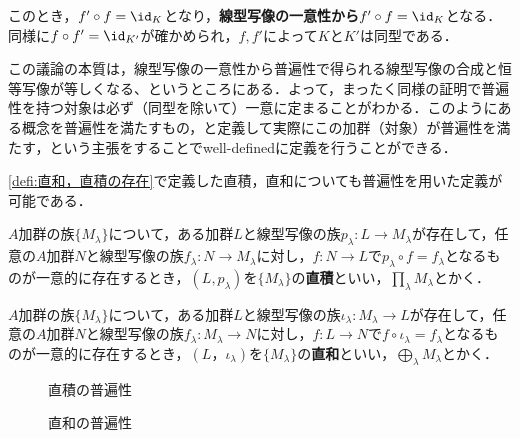 このとき，$f'\circ f=\id_K$となり，\textbf{線型写像の一意性から}$f'\circ f=\id_K$となる．同様に$f\circ f'=\id_{K'}$が確かめられ，$f,f'$によって$K$と$K'$は同型である．

この議論の本質は，線型写像の一意性から普遍性で得られる線型写像の合成と恒等写像が等しくなる、というところにある．よって，まったく同様の証明で普遍性を持つ対象は必ず（同型を除いて）一意に定まることがわかる．このようにある概念を普遍性を満たすもの，と定義して実際にこの加群（対象）が普遍性を満たす，という主張をすることでwell-definedに定義を行うことができる．

\ref{defi:直和，直積の存在}で定義した直積，直和についても普遍性を用いた定義が可能である．

\begin{defi}[普遍性を用いた直積の定義]
	$A$加群の族$\{M_\lambda\}$について，ある加群$L$と線型写像の族$p_\lambda:L\to M_\lambda$が存在して，任意の$A$加群$N$と線型写像の族$f_\lambda:N\to M_\lambda$に対し，$f:N\to L$で$p_\lambda\circ f=f_\lambda$となるものが一意的に存在するとき，$(L,p_\lambda)$を$\{M_\lambda\}$の\textbf{直積}といい，$\prod_\lambda M_\lambda$とかく．
\end{defi}

\begin{defi}[普遍性を用いた直和の定義]
	$A$加群の族$\{M_\lambda\}$について，ある加群$L$と線型写像の族$\iota_\lambda: M_\lambda\to L$が存在して，任意の$A$加群$N$と線型写像の族$f_\lambda: M_\lambda\to N$に対し，$f:L\to N$で$f\circ\iota_\lambda=f_\lambda$となるものが一意的に存在するとき，$(L，\iota_\lambda)$を$\{M_\lambda\}$の\textbf{直和}といい，$\bigoplus_\lambda M_\lambda$とかく．
\end{defi}

\begin{minipage}{.45\textwidth}
	\begin{figure}[H]
		\centering
		\caption{直積の普遍性}
	\end{figure}
\end{minipage}
\hfill
\begin{minipage}{.45\textwidth}
	\begin{figure}[H]
		\centering
		\caption{直和の普遍性}
	\end{figure}
\end{minipage}

